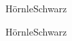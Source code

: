 \documentclass[a4paper]{article}
\begin{document}
\pagestyle{empty}
\centering

\renewcommand{\familydefault}{\sfdefault}
\bf
\Huge

\begin{minipage}{7cm}
  Hörnle\hfill \bell \hfill Schwarz
\end{minipage}

\vspace{4cm}

\begin{minipage}{7.5cm}
  Hörnle\hfill \Letter \hfill Schwarz
\end{minipage}
\end{document}
